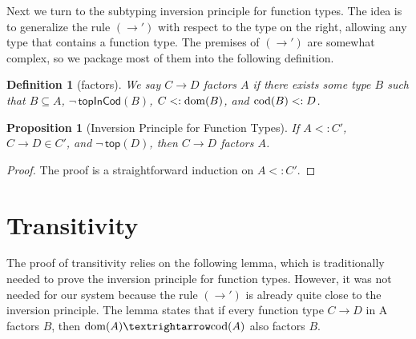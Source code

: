 \documentclass{article}
\newtheorem{proposition}[theorem]{Proposition}
\newtheorem{definition}[theorem]{Definition}
\begin{document}
Next we turn to the subtyping inversion principle for function types.
The idea is to generalize the rule $(→')$ with respect to the type on
the right, allowing any type that contains a function type.  The
premises of $(→')$ are somewhat complex, so we package most of them
into the following definition.

\begin{definition}[factors]
  We say $C → D$ \emph{factors} $A$
  if there exists some type $B$ such that
  $B ⊆ A$, $\neg\,\mathsf{topInCod}(B)$, $C <: \mathrm{dom}(B)$, and $\mathrm{cod}(B) <: D$.
\end{definition}

\begin{proposition}[Inversion Principle for Function Types]\label{lem:⊑-fun-inv}
  If $A <: C'$, $C → D ∈ C'$, and $\neg\,\mathsf{top}(D)$, then
  $C → D$ factors $A$.
\end{proposition}
\begin{proof}
  The proof is a straightforward induction on $A <: C'$.
\end{proof}

\section{Transitivity}

The proof of transitivity relies on the following lemma, which is
traditionally needed to prove the inversion principle for function
types. However, it was not needed for our system because the rule
$(→')$ is already quite close to the inversion principle.
The lemma states that if every function type $C → D$ in A
factors $B$, then $\dom{A} → \cod{A}$ also factors $B$.
\end{document}
